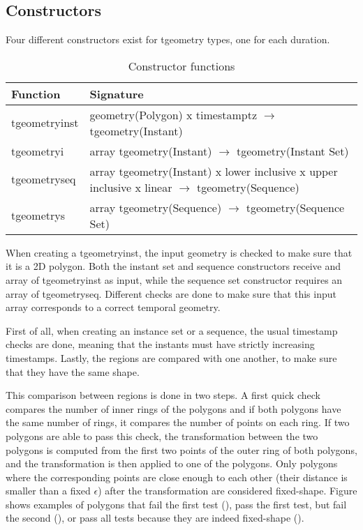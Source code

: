 \subsection{Constructors}
\label{section:constructors}

Four different constructors exist for tgeometry types, one for each duration.

\begin{table}[h!]
    \centering
    \begin{tabularx}{\textwidth}{|l|X|}
    \hline
    \textbf{Function}   & \textbf{Signature} \\ 
    \hline
    tgeometryinst       & geometry(Polygon) x timestamptz $\rightarrow$ tgeometry(Instant) \\
    \hline
    tgeometryi          & array tgeometry(Instant) $\rightarrow$ tgeometry(Instant Set) \\
    \hline
    tgeometryseq        & array tgeometry(Instant) x lower inclusive x upper inclusive x linear $\rightarrow$ tgeometry(Sequence) \\
    \hline
    tgeometrys          & array tgeometry(Sequence) $\rightarrow$ tgeometry(Sequence Set) \\
    \hline
    \end{tabularx}
    \caption{Constructor functions}
    \label{table:constructor_funcs}
\end{table}

When creating a tgeometryinst, the input geometry is checked to make sure that it is a 2D polygon. Both the instant set and sequence constructors receive and array of tgeometryinst as input, while the sequence set constructor requires an array of tgeometryseq. Different checks are done to make sure that this input array corresponds to a correct temporal geometry.

First of all, when creating an instance set or a sequence, the usual timestamp checks are done, meaning that the instants must have strictly increasing timestamps. Lastly, the regions are compared with one another, to make sure that they have the same shape.

This comparison between regions is done in two steps. A first quick check compares the number of inner rings of the polygons and if both polygons have the same number of rings, it compares the number of points on each ring. If two polygons are able to pass this check, the transformation between the two polygons is computed from the first two points of the outer ring of both polygons, and the transformation is then applied to one of the polygons. Only polygons where the corresponding points are close enough to each other (their distance is smaller than a fixed $\epsilon$) after the transformation are considered fixed-shape. Figure  shows examples of polygons that fail the first test (), pass the first test, but fail the second (), or pass all tests because they are indeed fixed-shape ().

